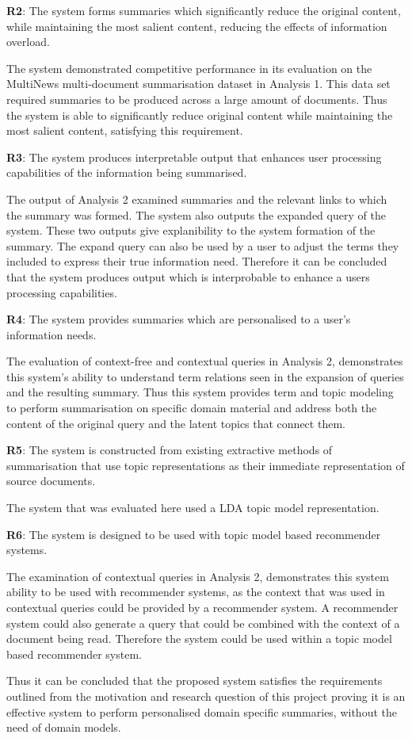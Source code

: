\textbf{R2}: The system forms summaries which significantly reduce the original content, while maintaining the most salient content, reducing the effects of information overload.

The system demonstrated competitive performance in its evaluation on the MultiNews multi-document summarisation dataset in Analysis 1. This data set required summaries to be produced across a large amount of documents. Thus the system is able to significantly reduce original content while maintaining the most salient content, satisfying this requirement.

\textbf{R3}: The system produces interpretable output that enhances user processing capabilities of the information being summarised.

The output of Analysis 2 examined summaries and the relevant links to which the summary was formed. The system also outputs the expanded query of the system. These two outputs give explanibility to the system formation of the summary. The expand query can also be used by a user to adjust the terms they included to express their true information need. Therefore it can be concluded that the system produces output which is interprobable to enhance a users processing capabilities.

\textbf{R4}: The system provides summaries which are personalised to a user's information needs.

The evaluation of context-free and contextual queries in Analysis 2, demonstrates this system's ability to understand term relations seen in the expansion of queries and the resulting summary. Thus this system provides term and topic modeling to perform summarisation on specific domain material and address both the content of the original query and the latent topics that connect them.

\textbf{R5}: The system is constructed from existing extractive methods of summarisation that use topic representations as their immediate representation of source documents.

The system that was evaluated here used a LDA topic model representation.

\textbf{R6}: The system is designed to be used with topic model based recommender systems.

The examination of contextual queries in Analysis 2, demonstrates this system ability to be used with recommender systems, as the context that was used in contextual queries could be provided by a recommender system. A recommender system could also generate a query that could be combined with the context of a document being read. Therefore the system could be used within a topic model based recommender system.

Thus it can be concluded that the proposed system satisfies the requirements outlined from the motivation and research question of this project proving it is an effective system to perform personalised domain specific summaries, without the need of domain models.
